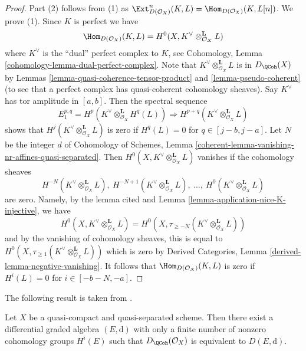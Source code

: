 \begin{proof}
Part (2) follows from (1) as $\Ext^n_{D(\mathcal{O}_X)}(K, L) =
\Hom_{D(\mathcal{O}_X)}(K, L[n])$. We prove (1).
Since $K$ is perfect we have
$$
\Hom_{D(\mathcal{O}_X)}(K, L) =
H^0(X, K^\vee \otimes_{\mathcal{O}_X}^\mathbf{L} L)
$$
where $K^\vee$ is the ``dual'' perfect complex to $K$, see
Cohomology, Lemma \ref{cohomology-lemma-dual-perfect-complex}.
Note that $K^\vee \otimes_{\mathcal{O}_X}^\mathbf{L} L$
is in $D_\QCoh(X)$ by
Lemmas \ref{lemma-quasi-coherence-tensor-product} and
\ref{lemma-pseudo-coherent} (to see that a perfect complex
has quasi-coherent cohomology sheaves). Say $K^\vee$ has
tor amplitude in $[a, b]$. Then the spectral sequence
$$
E_1^{p, q} = H^p(K^\vee \otimes_{\mathcal{O}_X}^\mathbf{L} H^q(L))
\Rightarrow
H^{p + q}(K^\vee \otimes_{\mathcal{O}_X}^\mathbf{L} L)
$$
shows that $H^j(K^\vee \otimes_{\mathcal{O}_X}^\mathbf{L} L)$
is zero if $H^q(L) = 0$ for $q \in [j - b, j - a]$.
Let $N$ be the integer $d$ of Cohomology of Schemes,
Lemma \ref{coherent-lemma-vanishing-nr-affines-quasi-separated}.
Then $H^0(X, K^\vee \otimes_{\mathcal{O}_X}^\mathbf{L} L)$
vanishes if the cohomology sheaves
$$
H^{-N}(K^\vee \otimes_{\mathcal{O}_X}^\mathbf{L} L),
\ H^{-N + 1}(K^\vee \otimes_{\mathcal{O}_X}^\mathbf{L} L),
\ \ldots,
\ H^0(K^\vee \otimes_{\mathcal{O}_X}^\mathbf{L} L)
$$
are zero. Namely, by the lemma cited and
Lemma \ref{lemma-application-nice-K-injective}, we have
$$
H^0(X, K^\vee \otimes_{\mathcal{O}_X}^\mathbf{L} L) =
H^0(X, \tau_{\geq -N}(K^\vee \otimes_{\mathcal{O}_X}^\mathbf{L} L))
$$
and by the vanishing of cohomology sheaves, this is equal to
$H^0(X, \tau_{\geq 1}(K^\vee \otimes_{\mathcal{O}_X}^\mathbf{L} L))$
which is zero by Derived Categories, Lemma
\ref{derived-lemma-negative-vanishing}.
It follows that $\Hom_{D(\mathcal{O}_X)}(K, L)$ is zero if
$H^i(L) = 0$ for $i \in [-b - N, -a]$.
\end{proof}

\noindent
The following result is taken from \cite{BvdB}.

\begin{theorem}
\label{theorem-DQCoh-is-Ddga}
Let $X$ be a quasi-compact and quasi-separated scheme.
Then there exist a differential graded algebra $(E, \text{d})$
with only a finite number of nonzero cohomology groups $H^i(E)$
such that $D_\QCoh(\mathcal{O}_X)$ is equivalent
to $D(E, \text{d})$.
\end{theorem}

